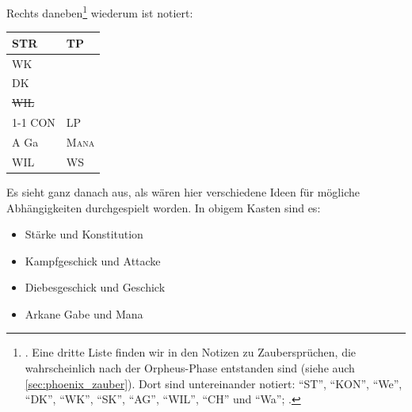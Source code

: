 \documentclass[a5paper,pagesize,numbers=noenddot]{scrbook}
\begin{document}
\vspace{1em}

\vspace{1em}
\noindent Rechts daneben\footnote{\autocite[S.~8]{orpheus_b_scribbles}. Eine dritte Liste finden wir in den Notizen zu Zaubersprüchen, die wahrscheinlich nach der Orpheus-Phase entstanden sind (siehe auch \autoref{sec:phoenix_zauber}). Dort sind untereinander notiert: \enquote{ST}, \enquote{KON}, \enquote{We}, \enquote{DK}, \enquote{WK}, \enquote{SK}, \enquote{AG}, \enquote{WIL}, \enquote{CH} und \enquote{Wa}; \autocite[S.~8]{gothic_spells}.} wiederum ist notiert:

\vspace{1em}
\begin{tabular}{ll}
   STR          & TP              \\\hline
   WK           &                 \\
   DK           &                 \\
   \sout{WIL}   &                 \\\cline{1-1}
   CON          & LP              \\
   A Ga         & \textsc{Mana}   \\
   WIL          & WS              \\
\end{tabular}

\vspace{1em}
\noindent Es sieht ganz danach aus, als wären hier verschiedene Ideen für mögliche Abhängigkeiten durchgespielt worden.
In obigem Kasten sind es:

\begin{itemize}
   \item Stärke und Konstitution
   \item Kampfgeschick und Attacke
   \item Diebesgeschick und Geschick
   \item Arkane Gabe und Mana
\end{itemize}
\end{document}
